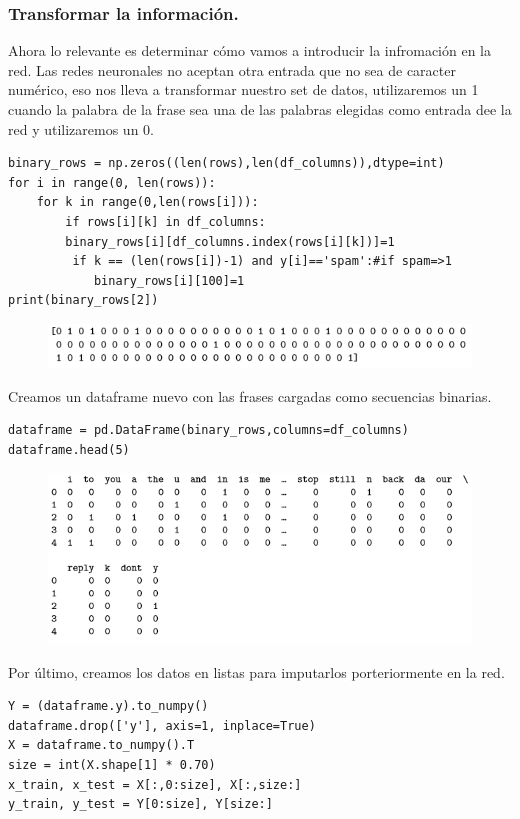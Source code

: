 \documentclass[a4paper,10pt]{article}
\begin{document}
\subsubsection{Transformar la información.}
Ahora lo relevante es determinar cómo vamos a introducir la infromación en la red. Las redes neuronales no aceptan otra entrada que no sea de caracter numérico, eso nos lleva a transformar nuestro set de datos, utilizaremos un 1 cuando la palabra de la frase sea una de las palabras elegidas como entrada dee la red y utilizaremos un 0.
\begin{lstlisting}
binary_rows = np.zeros((len(rows),len(df_columns)),dtype=int) 
for i in range(0, len(rows)): 
    for k in range(0,len(rows[i])):
        if rows[i][k] in df_columns: 
	    binary_rows[i][df_columns.index(rows[i][k])]=1
         if k == (len(rows[i])-1) and y[i]=='spam':#if spam=>1 
            binary_rows[i][100]=1
print(binary_rows[2])
\end{lstlisting}
\begin{figure}[H]
\centering
\includegraphics[scale=0.83]{Annotation 2020-03-23 182035.png}
\end{figure}
Creamos un dataframe nuevo con las frases cargadas como secuencias binarias.
\begin{lstlisting}
dataframe = pd.DataFrame(binary_rows,columns=df_columns) 
dataframe.head(5)
\end{lstlisting}
\begin{figure}[H]
\centering
\includegraphics[scale=0.83]{Annotation 2020-03-23 182154.png}
\end{figure}
Por último, creamos los datos en listas para imputarlos porteriormente en la red.
\begin{lstlisting}
Y = (dataframe.y).to_numpy() 
dataframe.drop(['y'], axis=1, inplace=True)
X = dataframe.to_numpy().T 
size = int(X.shape[1] * 0.70) 
x_train, x_test = X[:,0:size], X[:,size:] 
y_train, y_test = Y[0:size], Y[size:]
\end{lstlisting}
\end{document}
